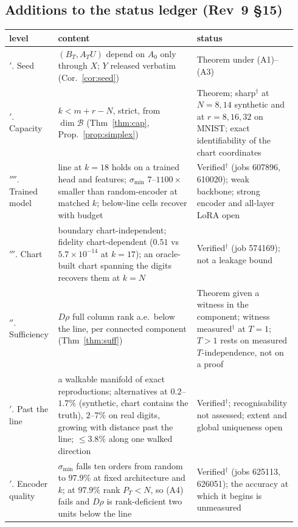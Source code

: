 \subsection{Additions to the status ledger (Rev~9 \S15)}
\label{sec:ledger}
\begin{center}\small
\begin{tabular}{@{}>{\raggedright\arraybackslash}p{0.13\linewidth}>{\raggedright\arraybackslash}p{0.47\linewidth}>{\raggedright\arraybackslash}p{0.34\linewidth}@{}}\toprule
level & content & status\\ \midrule
2$'$. Seed & $(B_T,A_TU)$ depend on $A_0$ only through $X$; $Y$ released verbatim (Cor.~\ref{cor:seed}) & Theorem under (A1)--(A3)\\
3$'$. Capacity & $k<m+r-N$, strict, from $\dim\mathcal B$ (Thm~\ref{thm:cap}, Prop.~\ref{prop:simplex}) & Theorem; sharp$^\dagger$ at $N=8,14$ synthetic and at $r=8,16,32$ on MNIST; exact identifiability of the chart coordinates\\
3$''''$. Trained model & line at $k=18$ holds on a trained head and features; $\sigma_{\min}$ $7$--$1100\times$ smaller than random-encoder at matched $k$; below-line cells recover with budget & Verified$^\dagger$ (jobs 607896, 610020); weak backbone; strong encoder and all-layer LoRA open\\
3$'''$. Chart & boundary chart-independent; fidelity chart-dependent ($0.51$ vs $5.7\times10^{-14}$ at $k=17$); an oracle-built chart spanning the digits recovers them at $k=N$ & Verified$^\dagger$ (job 574169); not a leakage bound\\
3$''$. Sufficiency & $D\rho$ full column rank a.e.\ below the line, per connected component (Thm~\ref{thm:suff}) & Theorem given a witness in the component; witness measured$^\dagger$ at $T=1$; $T>1$ rests on measured $T$-independence, not on a proof\\
5$'$. Past the line & a walkable manifold of exact reproductions; alternatives at $0.2$--$1.7\%$ (synthetic, chart contains the truth), $2$--$7\%$ on real digits, growing with distance past the line; $\le3.8\%$ along one walked direction & Verified$^\dagger$; recognisability not assessed; extent and global uniqueness open\\
6$'$. Encoder quality & $\sigma_{\min}$ falls ten orders from random to $97.9\%$ at fixed architecture and $k$; at $97.9\%$ rank $P_T<N$, so (A4) fails and $D\rho$ is rank-deficient two units below the line & Verified$^\dagger$ (jobs 625113, 626051); the accuracy at which it begins is unmeasured\\

\end{tabular}
\end{center}
